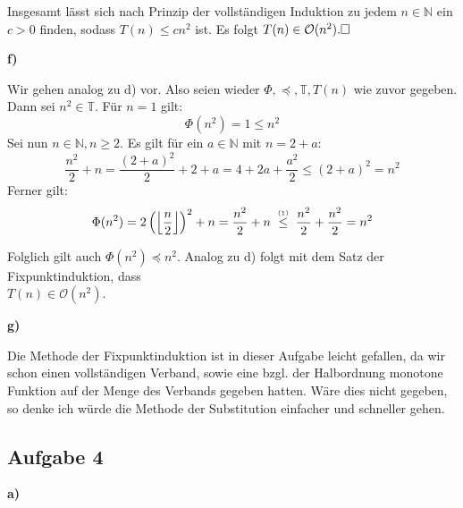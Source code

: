 \documentclass[a4paper,graphics,11pt]{article}
\newcommand{\aufgabe}[1]{\subsection*{Aufgabe #1}}
\newcommand{\up}[2]{\mathrel{\overset{\makebox[0pt]{\mbox{\normalfont\tiny #2}}}{#1}}}
\begin{document}
Insgesamt lässt sich nach Prinzip der vollständigen Induktion zu jedem $n \in \mathbb{N}$ ein $c > 0$
finden, sodass $T(n) \leq cn^2$ ist. Es folgt $T(n) \in \mathcal{O}(n^2).\hfill\square$

\textbf{f)}

Wir gehen analog zu d) vor. Also seien wieder $\Phi, \preceq, \mathbb{T}, T(n)$ wie zuvor gegeben.\\
Dann sei $n^2 \in \mathbb{T}$. Für $n = 1$ gilt:
$$
    \Phi(n^2) = 1 \leq n^2
$$
Sei nun $n \in \mathbb{N}, n\geq 2$. Es gilt für ein $a \in \mathbb{N}$ mit $n = 2+a$:
\begin{equation}
    \frac{n^2}{2} + n = \frac{(2+a)^2}{2} + 2+a = 4 + 2a +\frac{a^2}{2} \leq (2+a)^2 = n^2
\end{equation}
Ferner gilt:
$$
    \Phi(n^2) = 2 \left(\left\lfloor\frac{n}{2}\right\rfloor\right)^2 + n
    = \frac{n^2}{2} + n
    \ \up{\leq}{(1)}\ \frac{n^2}{2} + \frac{n^2}{2}
    = n^2
$$

Folglich gilt auch $\Phi(n^2)\preceq n^2$.
Analog zu d) folgt mit dem Satz der Fixpunktinduktion, dass\\
$T(n) \in \mathcal{O}(n^2)$.

\textbf{g)}

Die Methode der Fixpunktinduktion ist in dieser Aufgabe leicht gefallen, da wir schon
einen vollständigen Verband, sowie eine bzgl. der Halbordnung monotone Funktion auf der Menge
des Verbands gegeben hatten. Wäre dies nicht gegeben, so denke ich würde die Methode der Substitution
einfacher und schneller gehen.

\aufgabe{4}
\textbf{a)}
\end{document}
